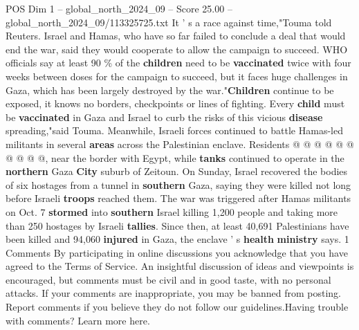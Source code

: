 \begin{textsample}{POS Dim 1 – global\_north\_2024\_09 – Score 25.00 – global\_north\_2024\_09/113325725.txt}
It ' s a race against time,"Touma told Reuters.
Israel and Hamas, who have so far failed to conclude a deal that would end the war, said they would cooperate to allow the campaign to succeed.
WHO officials say at least 90 \% of the \textbf{children} need to be \textbf{vaccinated} twice with four weeks between doses for the campaign to succeed, but it faces huge challenges in Gaza, which has been largely destroyed by the war."\textbf{Children} continue to be exposed, it knows no borders, checkpoints or lines of fighting.
Every \textbf{child} must be \textbf{vaccinated} in Gaza and Israel to curb the risks of this vicious \textbf{disease} spreading,"said Touma.
Meanwhile, Israeli forces continued to battle Hamas-led militants in several \textbf{areas} across the Palestinian enclave.
Residents @ @ @ @ @ @ @ @ @ @, near the border with Egypt, while \textbf{tanks} continued to operate in the \textbf{northern} Gaza \textbf{City} suburb of Zeitoun.
On Sunday, Israel recovered the bodies of six hostages from a tunnel in \textbf{southern} Gaza, saying they were killed not long before Israeli \textbf{troops} reached them.
The war was triggered after Hamas militants on Oct. 7 \textbf{stormed} into \textbf{southern} Israel killing 1,200 people and taking more than 250 hostages by Israeli \textbf{tallies}.
Since then, at least 40,691 Palestinians have been killed and 94,060 \textbf{injured} in Gaza, the enclave ' s \textbf{health} \textbf{ministry} says. 1 Comments By participating in online discussions you acknowledge that you have agreed to the Terms of Service.
An insightful discussion of ideas and viewpoints is encouraged, but comments must be civil and in good taste, with no personal attacks.
If your comments are inappropriate, you may be banned from posting.
Report comments if you believe they do not follow our guidelines.Having trouble with comments?
Learn more here.

\end{textsample}
